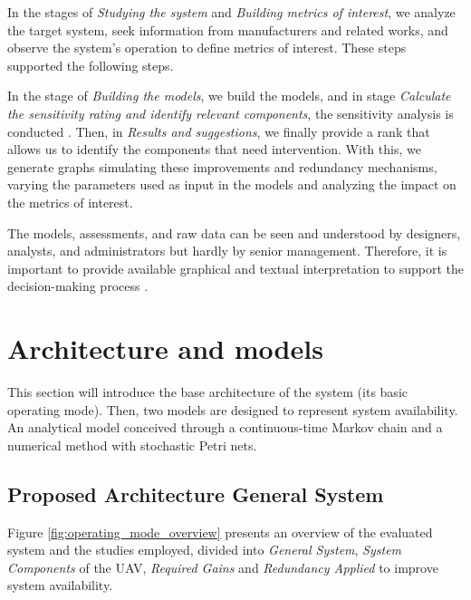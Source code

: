 \documentclass[conference]{IEEEtran}
\begin{document}
In the stages of \textit{Studying the system} and \textit{Building metrics of interest}, we analyze the target system, seek information from manufacturers and related works, and observe the system's operation to define metrics of interest. These steps supported the following steps.

In the stage of \textit{Building the models}, we build the models, and in stage \textit{Calculate the sensitivity rating and identify relevant components}, the sensitivity analysis is conducted \citep{maciel2017mercury, matos2020bottleneck, de2014redundant}. Then, in \textit{Results and suggestions}, we finally provide a rank that allows us to identify the components that need intervention. With this, we generate graphs simulating these improvements and redundancy mechanisms, varying the parameters used as input in the models and analyzing the impact on the metrics of interest. 

The models, assessments, and raw data can be seen and understood by designers, analysts, and administrators but hardly by senior management. Therefore, it is important to provide available graphical and textual interpretation to support the decision-making process \citep{melo2021distributed}. 

\section{Architecture and models}
\label{sec:model}

This section will introduce the base architecture of the system (its basic operating mode). Then, two models are designed to represent system availability. An analytical model conceived through a continuous-time Markov chain and a numerical method with stochastic Petri nets.

\subsection{Proposed Architecture General System}

Figure \ref{fig:operating_mode_overview} presents an overview of the evaluated system and the studies employed, divided into \textit{General System}, \textit{System Components} of the UAV, \textit{Required Gains} and \textit{Redundancy Applied} to improve system availability.
\end{document}
